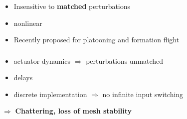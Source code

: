 \documentclass[12pt,svgnames,table,draft=false]{beamer}
\begin{document}
\begin{frame}\frametitle{}
\centering

\begin{tcolorbox}[colback=blue!5!white,colframe=blue!75!black,title=Ideal Sliding Mode Control, width=20em,
standard jigsaw,
opacityback=.7]
\begin{itemize}
\item Insensitive to \textbf{matched} perturbations
\item nonlinear
\item Recently proposed for platooning \cite{Fahimi2007} and formation flight \cite{galzi2006uav}
\end{itemize}
\end{tcolorbox}

\end{frame}

\begin{frame}\frametitle{}
\centering
\begin{tcolorbox}[colback=blue!5!white,colframe=blue!75!black,title=Clash with reality, width=20em,
standard jigsaw,
opacityback=.7]
\begin{itemize}
\item actuator dynamics $\Rightarrow$ perturbations unmatched 
\item delays
\item discrete implementation $\Rightarrow$ no infinite input switching
\end{itemize}
\centering
$\Rightarrow$ \textbf{ Chattering, loss of mesh stability} 
\end{tcolorbox}
\end{frame}
\end{document}
